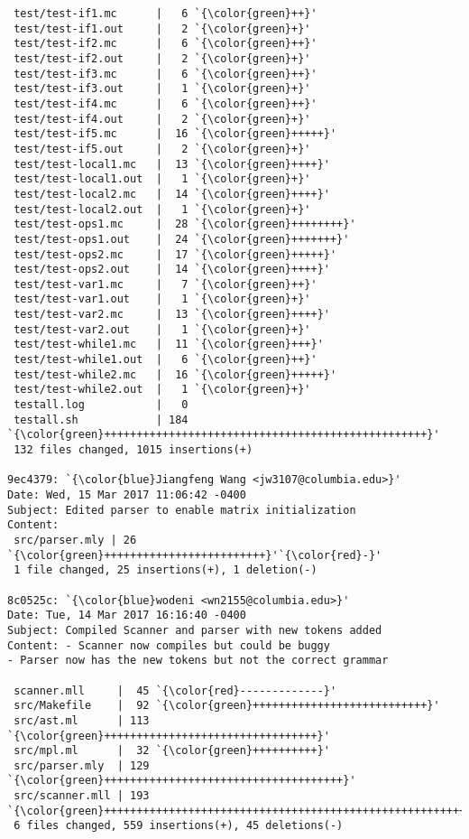 \begin{lstlisting}
 test/test-if1.mc      |   6 `{\color{green}++}'
 test/test-if1.out     |   2 `{\color{green}+}'
 test/test-if2.mc      |   6 `{\color{green}++}'
 test/test-if2.out     |   2 `{\color{green}+}'
 test/test-if3.mc      |   6 `{\color{green}++}'
 test/test-if3.out     |   1 `{\color{green}+}'
 test/test-if4.mc      |   6 `{\color{green}++}'
 test/test-if4.out     |   2 `{\color{green}+}'
 test/test-if5.mc      |  16 `{\color{green}+++++}'
 test/test-if5.out     |   2 `{\color{green}+}'
 test/test-local1.mc   |  13 `{\color{green}++++}'
 test/test-local1.out  |   1 `{\color{green}+}'
 test/test-local2.mc   |  14 `{\color{green}++++}'
 test/test-local2.out  |   1 `{\color{green}+}'
 test/test-ops1.mc     |  28 `{\color{green}++++++++}'
 test/test-ops1.out    |  24 `{\color{green}+++++++}'
 test/test-ops2.mc     |  17 `{\color{green}+++++}'
 test/test-ops2.out    |  14 `{\color{green}++++}'
 test/test-var1.mc     |   7 `{\color{green}++}'
 test/test-var1.out    |   1 `{\color{green}+}'
 test/test-var2.mc     |  13 `{\color{green}++++}'
 test/test-var2.out    |   1 `{\color{green}+}'
 test/test-while1.mc   |  11 `{\color{green}+++}'
 test/test-while1.out  |   6 `{\color{green}++}'
 test/test-while2.mc   |  16 `{\color{green}+++++}'
 test/test-while2.out  |   1 `{\color{green}+}'
 testall.log           |   0
 testall.sh            | 184 `{\color{green}++++++++++++++++++++++++++++++++++++++++++++++++++}'
 132 files changed, 1015 insertions(+)

9ec4379: `{\color{blue}Jiangfeng Wang <jw3107@columbia.edu>}'
Date: Wed, 15 Mar 2017 11:06:42 -0400
Subject: Edited parser to enable matrix initialization
Content: 
 src/parser.mly | 26 `{\color{green}+++++++++++++++++++++++++}'`{\color{red}-}'
 1 file changed, 25 insertions(+), 1 deletion(-)

8c0525c: `{\color{blue}wodeni <wn2155@columbia.edu>}'
Date: Tue, 14 Mar 2017 16:16:40 -0400
Subject: Compiled Scanner and parser with new tokens added
Content: - Scanner now compiles but could be buggy
- Parser now has the new tokens but not the correct grammar

 scanner.mll     |  45 `{\color{red}-------------}'
 src/Makefile    |  92 `{\color{green}+++++++++++++++++++++++++++}'
 src/ast.ml      | 113 `{\color{green}+++++++++++++++++++++++++++++++++}'
 src/mpl.ml      |  32 `{\color{green}++++++++++}'
 src/parser.mly  | 129 `{\color{green}+++++++++++++++++++++++++++++++++++++}'
 src/scanner.mll | 193 `{\color{green}++++++++++++++++++++++++++++++++++++++++++++++++++++++++}'
 6 files changed, 559 insertions(+), 45 deletions(-)


\end{lstlisting}
